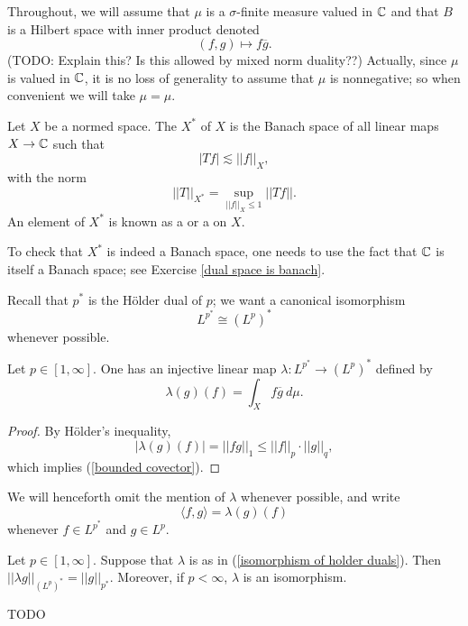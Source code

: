 Throughout, we will assume that $\mu$ is a $\sigma$-finite measure valued in $\mathbb{C}$ and that $B$ is a Hilbert space with inner product denoted
\[(f, g) \mapsto f \overline g.\]
(TODO: Explain this? Is this allowed by mixed norm duality??)
Actually, since $\mu$ is valued in $\mathbb{C}$, it is no loss of generality to assume that $\mu$ is nonnegative; so when convenient we will take $\mu = \mu$.

\begin{definition}
Let $X$ be a normed space.
The  $X^*$ of $X$ is the Banach space of all linear maps $X \to \mathbb{C}$ such that
\begin{equation}
\label{bounded covector}
|Tf| \lesssim ||f||_X,
\end{equation}
with the norm
\[||T||_{X^*} = \sup_{||f||_{X} \leq 1} ||Tf||.\]
An element of $X^*$ is known as a  or a  on $X$.
\end{definition}

To check that $X^*$ is indeed a Banach space, one needs to use the fact that $\mathbb{C}$ is itself a Banach space; see Exercise \ref{dual space is banach}.

Recall that $p^*$ is the H\"older dual of $p$; we want a canonical isomorphism
\[L^{p^*} \cong (L^p)^*\]
whenever possible.

\begin{lemma}
Let $p \in [1, \infty]$.
One has an injective linear map $\lambda: L^{p^*} \to (L^p)^*$ defined by
\begin{equation}
\label{isomorphism of holder duals}
\lambda(g)(f) = \int_{X} f\overline g ~d\mu.
\end{equation}
\end{lemma}
\begin{proof}
By H\"older's inequality,
\[|\lambda(g)(f)| = ||fg||_1 \leq ||f||_{p}  \cdot ||g||_q,\]
which implies (\ref{bounded covector}).
\end{proof}

We will henceforth omit the mention of $\lambda$ whenever possible, and write
\[\langle f, g\rangle = \lambda(g)(f)\]
whenever $f \in L^{p^*}$ and $g \in L^p$.

\begin{theorem}
Let $p \in [1, \infty]$.
Suppose that $\lambda$ is as in (\ref{isomorphism of holder duals}).
Then $||\lambda g||_{(L^p)^*} = ||g||_{p^*}$.
Moreover, if $p < \infty$, $\lambda$ is an isomorphism.
\end{theorem}
TODO

